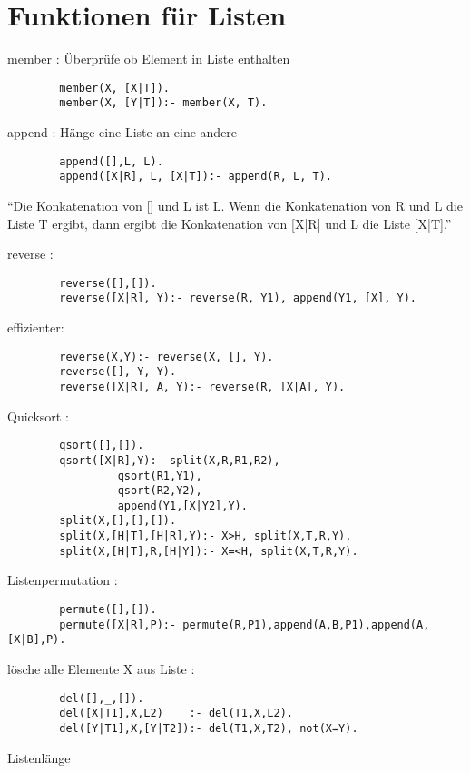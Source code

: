 \section{Funktionen für Listen}
\begin{compactitem}
	\item member : Überprüfe ob Element in Liste enthalten
		\begin{lstlisting}
		member(X, [X|T]).
		member(X, [Y|T]):- member(X, T).
		\end{lstlisting}
	\item append : Hänge eine Liste an eine andere
		\begin{lstlisting}
		append([],L, L).
		append([X|R], L, [X|T]):- append(R, L, T).
		\end{lstlisting}
		\enquote{Die Konkatenation von [] und L ist L. Wenn die Konkatenation von R und L die Liste T ergibt, dann ergibt die Konkatenation von [X|R] und L die Liste [X|T].}
	\item reverse : 		
		\begin{lstlisting}
		reverse([],[]).
		reverse([X|R], Y):- reverse(R, Y1), append(Y1, [X], Y).
		\end{lstlisting}
		effizienter:
		\begin{lstlisting}
		reverse(X,Y):- reverse(X, [], Y).
		reverse([], Y, Y).
		reverse([X|R], A, Y):- reverse(R, [X|A], Y).
		\end{lstlisting}
	\item Quicksort :
		\begin{lstlisting}
		qsort([],[]).
		qsort([X|R],Y):- split(X,R,R1,R2),
				 qsort(R1,Y1),
				 qsort(R2,Y2),
				 append(Y1,[X|Y2],Y).
		split(X,[],[],[]).
		split(X,[H|T],[H|R],Y):- X>H, split(X,T,R,Y).
		split(X,[H|T],R,[H|Y]):- X=<H, split(X,T,R,Y).
		\end{lstlisting}
	\item Listenpermutation :
		\begin{lstlisting}
		permute([],[]).
		permute([X|R],P):- permute(R,P1),append(A,B,P1),append(A,[X|B],P).
		\end{lstlisting}
	\item lösche alle Elemente X aus Liste :
		\begin{lstlisting}
		del([],_,[]).
		del([X|T1],X,L2)    :- del(T1,X,L2).
		del([Y|T1],X,[Y|T2]):- del(T1,X,T2), not(X=Y).
		\end{lstlisting}	
	\item Listenlänge 

\end{compactitem}
